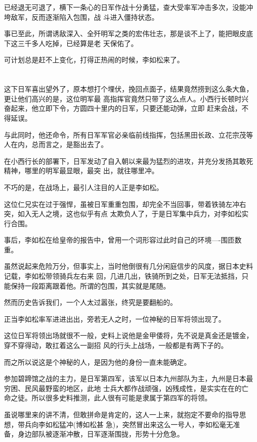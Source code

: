 \documentclass[11pt,a4paper,onecolumn]{article}
\begin{document}
已经退无可退了，横下一条心的日军作战十分勇猛，查大受率军冲击多次，没能冲垮敌军，反而逐渐陷入包围，战
斗进入僵持状态。

事已至此，所谓诱敌深入、全歼明军之类的宏伟壮志，那是谈不上了，能把眼皮底下这三千多人吃掉，已经算是老
天保佑了。

可计划总是赶不上变化，打得正热闹的时候，李如松来了。

\section[\thesection]{}

这下日军喜出望外了，原本想打个埋伏，挽回点面子，结果竟然捞到这么条大鱼，更让他们高兴的是，这位明军最
高指挥官竟然只带了这么点人。小西行长顿时兴奋起来，他立即下令，方圆四十里内的日军，只要还能动弹，立即
赶来会战，不得延误。

与此同时，他还命令，所有日军军官必亲临前线指挥，包括黑田长政、立花宗茂等人在内，总而言之，是豁出去了。

在小西行长的部署下，日军发动了自入朝以来最为猛烈的进攻，并充分发扬其敢死精神，哪里的明军最显眼，最突
出，就往哪里冲。

不巧的是，在战场上，最引人注目的人正是李如松。

这位仁兄实在过于强悍，虽被日军重重包围，却完全不当回事，带着铁骑左冲右突，如入无人之境，这也似乎有点
太欺负人了，于是日军集中兵力，对李如松实行合围。

事后，李如松在给皇帝的报告中，曾用一个词形容过此时自己的环境----围匝数重。

虽然说起来危险万分，但事实上，当时他倒很有几分闲庭信步的风度，据日本史料记载，李如松带领骑兵左右来
回，几进几出，铁骑所到之处，日军无法抵挡，只能保持一段距离跟着他。所谓的包围，其实就是尾随。

然而历史告诉我们，一个人太过嚣张，终究是要翻船的。

正当李如松率军进进出出，旁若无人之时，一位神秘的日军将领出现了。

这位日军将领出场就很不一般，史料上说他是金甲倭将，先不说是真金还是镀金，穿不穿得动，敢扛着这么一副招
风的行头上战场，一般都是有两下子的。

而之所以说这是个神秘的人，是因为他的身份一直未能确定。

参加碧蹄馆之战的主力，是日军第四军，该军以日本九州部队为主，九州是日本最穷困、民风最野蛮的地区，此地
士兵大都作战顽强，凶残成性，是实实在在的亡命之徒。所以很多史料推测，此人很有可能是隶属于第四军的将领。

虽说哪里来的讲不清，但敢拼命是肯定的，这人一上来，就抱定不要命的指导思想，带兵向李如松猛冲(博如松甚
急)，突然冒出来这么一号人，李如松毫无准备，身边部队被逐渐冲散，日军逐渐围拢，形势十分危急。
\end{document}
